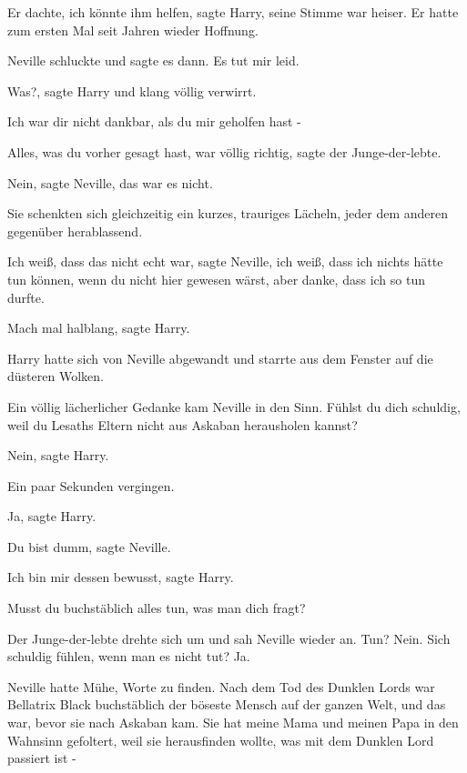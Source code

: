 \glqq{}Er dachte, ich könnte ihm helfen\grqq{}, sagte Harry, seine Stimme war
heiser. \glqq{}Er hatte zum ersten Mal seit Jahren wieder Hoffnung.\grqq{}

Neville schluckte und sagte es dann. \glqq{}Es tut mir leid.\grqq{}

\glqq{}Was?\grqq{}, sagte Harry und klang völlig verwirrt.

\glqq{}Ich war dir nicht dankbar, als du mir geholfen hast -\grqq{}

\glqq{}Alles, was du vorher gesagt hast, war völlig richtig\grqq{}, sagte der
Junge-der-lebte.

\glqq{}Nein\grqq{}, sagte Neville, \glqq{}das war es nicht.\grqq{}

Sie schenkten sich gleichzeitig ein kurzes, trauriges Lächeln, jeder dem anderen
gegenüber herablassend.

\glqq{}Ich weiß, dass das nicht echt war\grqq{}, sagte Neville, \glqq{}ich weiß,
dass ich nichts hätte tun können, wenn du nicht hier gewesen wärst, aber danke,
dass ich so tun durfte.\grqq{}

\glqq{}Mach mal halblang\grqq{}, sagte Harry.

Harry hatte sich von Neville abgewandt und starrte aus dem Fenster auf die
düsteren Wolken.

Ein völlig lächerlicher Gedanke kam Neville in den Sinn. \glqq{}Fühlst du dich
schuldig, weil du Lesaths Eltern nicht aus Askaban herausholen kannst?\grqq{}

\glqq{}Nein\grqq{}, sagte Harry.

Ein paar Sekunden vergingen.

\glqq{}Ja\grqq{}, sagte Harry.

\glqq{}Du bist dumm\grqq{}, sagte Neville.

\glqq{}Ich bin mir dessen bewusst\grqq{}, sagte Harry.

\glqq{}Musst du buchstäblich alles tun, was man dich fragt?\grqq{}

Der Junge-der-lebte drehte sich um und sah Neville wieder an. \glqq{}Tun? Nein.
Sich schuldig fühlen, wenn man es nicht tut? Ja.\grqq{}

Neville hatte Mühe, Worte zu finden. \glqq{}Nach dem Tod des Dunklen Lords war
Bellatrix Black buchstäblich der böseste Mensch auf der ganzen Welt, und das
war, bevor sie nach Askaban kam. Sie hat meine Mama und meinen Papa in den
Wahnsinn gefoltert, weil sie herausfinden wollte, was mit dem Dunklen Lord
passiert ist -\grqq{}

